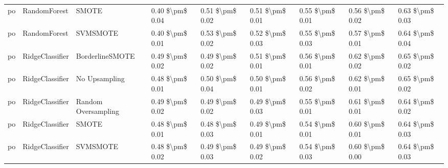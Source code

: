 \begin{tabular}{lllllllll}
      po &                    RandomForest &                         SMOTE & 0.40 \$\textbackslash pm\$ 0.04 &           0.51 \$\textbackslash pm\$ 0.02 &       0.51 \$\textbackslash pm\$ 0.01 &        0.55 \$\textbackslash pm\$ 0.01 &                         0.56 \$\textbackslash pm\$ 0.02 &     0.63 \$\textbackslash pm\$ 0.03 \\
      po &                    RandomForest &                      SVMSMOTE & 0.40 \$\textbackslash pm\$ 0.01 &           0.53 \$\textbackslash pm\$ 0.02 &       0.52 \$\textbackslash pm\$ 0.03 &        0.55 \$\textbackslash pm\$ 0.03 &                         0.57 \$\textbackslash pm\$ 0.01 &     0.64 \$\textbackslash pm\$ 0.04 \\
      po &                 RidgeClassifier &               BorderlineSMOTE & 0.49 \$\textbackslash pm\$ 0.02 &           0.49 \$\textbackslash pm\$ 0.02 &       0.51 \$\textbackslash pm\$ 0.01 &        0.56 \$\textbackslash pm\$ 0.01 &                         0.62 \$\textbackslash pm\$ 0.02 &     0.65 \$\textbackslash pm\$ 0.02 \\
      po &                 RidgeClassifier &                 No Upsampling & 0.48 \$\textbackslash pm\$ 0.01 &           0.50 \$\textbackslash pm\$ 0.04 &       0.50 \$\textbackslash pm\$ 0.01 &        0.56 \$\textbackslash pm\$ 0.02 &                         0.62 \$\textbackslash pm\$ 0.01 &     0.65 \$\textbackslash pm\$ 0.02 \\
      po &                 RidgeClassifier &           Random Oversampling & 0.49 \$\textbackslash pm\$ 0.02 &           0.49 \$\textbackslash pm\$ 0.02 &       0.49 \$\textbackslash pm\$ 0.03 &        0.55 \$\textbackslash pm\$ 0.01 &                         0.61 \$\textbackslash pm\$ 0.01 &     0.64 \$\textbackslash pm\$ 0.02 \\
      po &                 RidgeClassifier &                         SMOTE & 0.48 \$\textbackslash pm\$ 0.01 &           0.48 \$\textbackslash pm\$ 0.03 &       0.49 \$\textbackslash pm\$ 0.01 &        0.54 \$\textbackslash pm\$ 0.01 &                         0.60 \$\textbackslash pm\$ 0.01 &     0.64 \$\textbackslash pm\$ 0.03 \\
      po &                 RidgeClassifier &                      SVMSMOTE & 0.48 \$\textbackslash pm\$ 0.02 &           0.49 \$\textbackslash pm\$ 0.03 &       0.49 \$\textbackslash pm\$ 0.02 &        0.54 \$\textbackslash pm\$ 0.03 &                         0.60 \$\textbackslash pm\$ 0.00 &     0.64 \$\textbackslash pm\$ 0.03 \\

\end{tabular}
